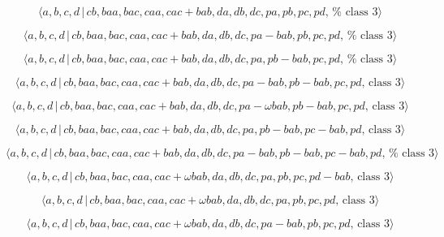 \documentclass[10pt]{article}
\begin{document}
\begin{equation}
\langle a,b,c,d\,|\,cb,baa,bac,caa,cac+bab,da,db,dc,pa,pb,pc,pd,\,\text{%
class }3\rangle  \tag{7.3777}
\end{equation}

\begin{equation}
\langle a,b,c,d\,|\,cb,baa,bac,caa,cac+bab,da,db,dc,pa-bab,pb,pc,pd,\,\text{%
class }3\rangle  \tag{7.3778}
\end{equation}

\begin{equation}
\langle a,b,c,d\,|\,cb,baa,bac,caa,cac+bab,da,db,dc,pa,pb-bab,pc,pd,\,\text{%
class }3\rangle  \tag{7.3779}
\end{equation}

\begin{equation}
\langle a,b,c,d\,|\,cb,baa,bac,caa,cac+bab,da,db,dc,pa-bab,pb-bab,pc,pd,\,%
\text{class }3\rangle  \tag{7.3780}
\end{equation}

\begin{equation}
\langle a,b,c,d\,|\,cb,baa,bac,caa,cac+bab,da,db,dc,pa-\omega
bab,pb-bab,pc,pd,\,\text{class }3\rangle  \tag{7.3781}
\end{equation}

\begin{equation}
\langle a,b,c,d\,|\,cb,baa,bac,caa,cac+bab,da,db,dc,pa,pb-bab,pc-bab,pd,\,%
\text{class }3\rangle  \tag{7.3782}
\end{equation}

\begin{equation}
\langle
a,b,c,d\,|\,cb,baa,bac,caa,cac+bab,da,db,dc,pa-bab,pb-bab,pc-bab,pd,\,\text{%
class }3\rangle  \tag{7.3783}
\end{equation}

\begin{equation}
\langle a,b,c,d\,|\,cb,baa,bac,caa,cac+\omega bab,da,db,dc,pa,pb,pc,pd-bab,\,%
\text{class }3\rangle  \tag{7.3784}
\end{equation}

\begin{equation}
\langle a,b,c,d\,|\,cb,baa,bac,caa,cac+\omega bab,da,db,dc,pa,pb,pc,pd,\,%
\text{class }3\rangle  \tag{7.3785}
\end{equation}

\begin{equation}
\langle a,b,c,d\,|\,cb,baa,bac,caa,cac+\omega bab,da,db,dc,pa-bab,pb,pc,pd,\,%
\text{class }3\rangle  \tag{7.3786}
\end{equation}
\end{document}
